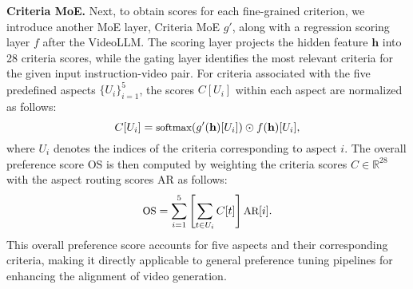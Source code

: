 \noindent \textbf{Criteria MoE.}
Next, to obtain scores for each fine-grained criterion, we introduce another MoE layer, Criteria MoE $g'$, along with a regression scoring layer $f$ after the VideoLLM. The scoring layer projects the hidden feature $\mathbf{h}$ into 28 criteria scores, while the gating layer identifies the most relevant criteria for the given input instruction-video pair. For criteria associated with the five predefined aspects $\{U_i\}_{i=1}^{5}$, the scores $C[U_i]$ within each aspect are normalized as follows:
\begin{equation}
\small
    C[U_i] = \textrm{softmax}(g'(\mathbf{h})[U_i]) \odot f(\mathbf{h})[U_i],
    \label{eq:criteria_scoring}
\end{equation}
where $U_i$ denotes the indices of the criteria corresponding to aspect $i$. The overall preference score \textrm{OS} is then computed by weighting the criteria scores $C \in \mathbb{R}^{28}$ with the aspect routing scores $\textrm{AR}$ as follows:
\begin{equation}
\small
    \textrm{OS} = \sum_{i=1}^{5} \left[\sum_{t \in U_i} C[t]\right] \textrm{AR}[i]
    .
    \label{eq:overall_preference}
\end{equation}
This overall preference score accounts for five aspects and their corresponding criteria, making it directly applicable to general preference tuning pipelines for enhancing the alignment of video generation.



